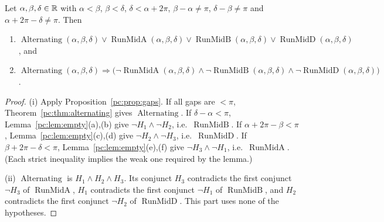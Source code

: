 \begin{theorem}\label{pc:thm:trichotomy}
Let $\alpha,\beta,\delta\in\mathbb R$ with $\alpha<\beta$, $\beta<\delta$, $\delta<\alpha+2\pi$, $\beta-\alpha\neq\pi$,
$\delta-\beta\neq\pi$ and $\alpha+2\pi-\delta\neq\pi$. Then
\begin{enumerate}[label=(\roman*)]
\item $\operatorname{Alternating}(\alpha,\beta,\delta)\vee\operatorname{RunMidA}(\alpha,\beta,\delta)\vee
  \operatorname{RunMidB}(\alpha,\beta,\delta)\vee\operatorname{RunMidD}(\alpha,\beta,\delta)$, and
\item $\operatorname{Alternating}(\alpha,\beta,\delta)\Rightarrow\bigl(\neg\operatorname{RunMidA}(\alpha,\beta,\delta)
  \wedge\neg\operatorname{RunMidB}(\alpha,\beta,\delta)\wedge\neg\operatorname{RunMidD}(\alpha,\beta,\delta)\bigr)$.
\end{enumerate}
\end{theorem}

\begin{proof}
(i) Apply Proposition~\ref{pc:prop:gaps}. If all gaps are $<\pi$, Theorem~\ref{pc:thm:alternating} gives
$\operatorname{Alternating}$. If $\delta-\alpha<\pi$, Lemma~\ref{pc:lem:empty}(a),(b) give $\neg H_1\wedge\neg H_2$,
i.e.\ $\operatorname{RunMidB}$. If $\alpha+2\pi-\beta<\pi$, Lemma~\ref{pc:lem:empty}(c),(d) give
$\neg H_2\wedge\neg H_3$, i.e.\ $\operatorname{RunMidD}$. If $\beta+2\pi-\delta<\pi$, Lemma~\ref{pc:lem:empty}(e),(f)
give $\neg H_3\wedge\neg H_1$, i.e.\ $\operatorname{RunMidA}$. (Each strict inequality implies the weak one
required by the lemma.)

(ii) $\operatorname{Alternating}$ is $H_1\wedge H_2\wedge H_3$. Its conjunct $H_3$ contradicts the first conjunct
$\neg H_3$ of $\operatorname{RunMidA}$, $H_1$ contradicts the first conjunct $\neg H_1$ of $\operatorname{RunMidB}$,
and $H_2$ contradicts the first conjunct $\neg H_2$ of $\operatorname{RunMidD}$. This part uses none of the
hypotheses.
\end{proof}

